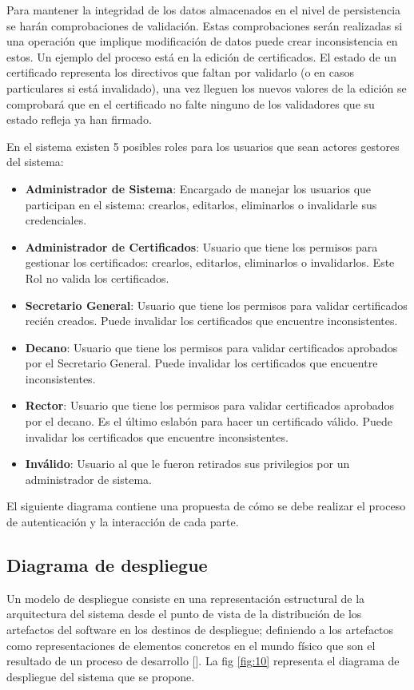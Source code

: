 Para mantener la integridad de los datos almacenados en el nivel de persistencia se harán comprobaciones de validación. Estas comprobaciones serán realizadas si una operación que implique modificación de datos puede crear inconsistencia en estos. Un ejemplo del proceso está en la edición de certificados. El estado de un certificado representa los directivos que faltan por validarlo (o en casos particulares si está invalidado), una vez lleguen los nuevos valores de la edición se comprobará que en el certificado no falte ninguno de los validadores que su estado refleja ya han firmado.


En el sistema existen 5 posibles roles para los usuarios que sean actores gestores del sistema:

\begin{itemize}
	\item \textbf{Administrador de Sistema}: Encargado de manejar los usuarios que participan en el sistema: crearlos, editarlos, eliminarlos o invalidarle sus credenciales.
	\item \textbf{Administrador de Certificados}: Usuario que tiene los permisos para gestionar los certificados: crearlos, editarlos, eliminarlos o invalidarlos. Este Rol no valida los certificados.
	\item \textbf{Secretario General}: Usuario que tiene los permisos para validar certificados recién creados. Puede invalidar los certificados que encuentre inconsistentes.
	\item \textbf{Decano}: Usuario que tiene los permisos para validar certificados aprobados por el Secretario General. Puede invalidar los certificados que encuentre inconsistentes.
	\item \textbf{Rector}: Usuario que tiene los permisos para validar certificados aprobados por el decano. Es el último eslabón para hacer un certificado válido. Puede invalidar los certificados que encuentre inconsistentes.
	\item \textbf{Inválido}: Usuario al que le fueron retirados sus privilegios por un administrador de sistema.
\end{itemize}

El siguiente diagrama contiene una propuesta de cómo se debe realizar el proceso de autenticación y la interacción de cada parte.


\subsection{Diagrama de despliegue}
Un modelo de despliegue consiste en una representación estructural de la arquitectura del sistema desde el punto de vista de la distribución de los artefactos del software en los destinos de despliegue; definiendo a los artefactos como representaciones de elementos concretos en el mundo físico que son el resultado de un proceso de desarrollo [\cite{91}]. La fig \ref{fig:10} representa el diagrama de despliegue del sistema que se propone.

